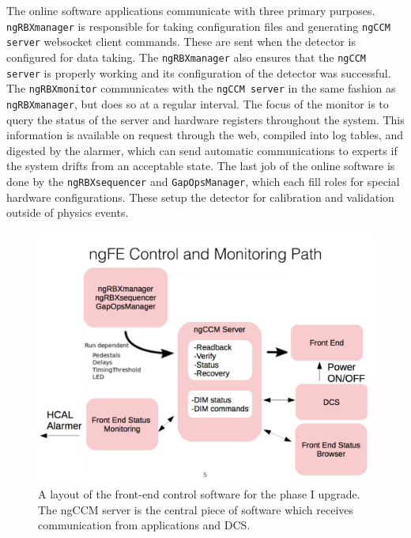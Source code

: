 The \HCAL online software applications communicate with three primary purposes.  \texttt{ngRBXmanager} is responsible for taking \HCAL configuration files and generating \texttt{ngCCM server} websocket client commands. These are sent when the detector is configured for data taking. The \texttt{ngRBXmanager} also ensures that the \texttt{ngCCM server} is properly working and its configuration of the detector was successful. The \texttt{ngRBXmonitor} communicates with the \texttt{ngCCM server} in the same fashion as \texttt{ngRBXmanager}, but does so at a regular interval. The focus of the monitor is to query the status of the server and hardware registers throughout the system. This information is available on request through the web, compiled into log tables, and digested by the \HCAL alarmer, which can send automatic communications to experts if the system drifts from an acceptable state. The last job of the \HCAL online software is done by the \texttt{ngRBXsequencer} and \texttt{GapOpsManager}, which each fill roles for special hardware configurations. These setup the detector for calibration and validation outside of physics events.
\begin{figure}[!tp]
    \centering
    \includegraphics[width=\textwidth]{figures/ngFEsoftware.pdf}
    \caption[
       \HCAL ngFE software control scheme. 
    ]{
       A layout of the \HCAL front-end control software for the phase I upgrade.  The ngCCM server is the central piece of software which receives communication from \HCAL applications and DCS.   
    }
    \label{fig:ngFESW}
\end{figure}


